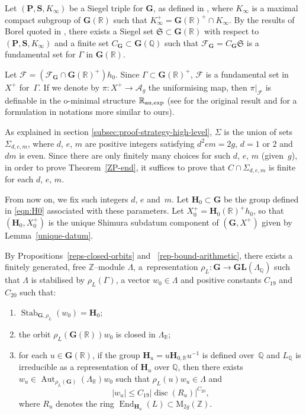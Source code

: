 \documentclass[JEP,XML,SOM,Unicode,NoFloatCountersInSection]{cedram}
\newenvironment{enumeratei}
{\bgroup\def\theenumi{\roman{enumi}}\def\theenumii{\alph{enumii}}\begin{enumerate}}
{\end{enumerate}\egroup}
\newcommand{\bQ}{\mathbb{Q}}
\newcommand{\bR}{\mathbb{R}}
\newcommand{\bZ}{\mathbb{Z}}
\newcommand{\cA}{\mathcal{A}}
\newcommand{\cF}{\mathcal{F}}
\newcommand{\fS}{\mathfrak{S}}
\newcommand{\gG}{\mathbf{G}}
\newcommand{\gGL}{\mathbf{GL}}
\newcommand{\gH}{\mathbf{H}}
\newcommand{\gP}{\mathbf{P}}
\newcommand{\gS}{\mathbf{S}}
\newcommand{\rM}{\mathrm{M}}
\DeclareMathOperator{\Aut}{Aut}
\DeclareMathOperator{\disc}{disc}
\DeclareMathOperator{\End}{End}
\DeclareMathOperator{\Stab}{Stab}
\newcommand{\abs}[1]{\lvert #1 \rvert}
\begin{document}
Let $(\gP, \gS, K_\infty)$ be a Siegel triple for $\gG$, as defined in \cite[\S2B]{Orr18}, where $K_\infty$ is a maximal compact subgroup of $\gG(\bR)$ such that $K^+_\infty=\gG(\bR)^+\cap K_\infty$.
By the results of Borel quoted in \cite[\S2D]{Orr18}, there exists a Siegel set $\fS \subset \gG(\bR)$ with respect to $(\gP, \gS, K_\infty)$ and a finite set $C_\gG\subset\gG(\bQ)$ such that $\cF_{\gG}=C_\gG\fS$ is a fundamental set for $\Gamma$ in $\gG(\bR)$.

Let $\cF = (\cF_\gG \cap \gG(\bR)^+) h_0$. Since $\Gamma \subset \gG(\bR)^+$, $\cF$ is a fundamental set in $X^+$ for~$\Gamma$. If we denote by $\pi:X^+\to\cA_g$ the uniformising map, then $\pi|_{\cF}$ is definable in the o-minimal structure $\bR_{\rm an,exp}$ (see \cite{PS10} for the original result and \cite{kuy:ax-lindemann} for a formulation in notations more similar to ours).

As explained in section \ref{subsec:proof-strategy-high-level}, $\Sigma$ is the union of sets $\Sigma_{d,e,m}$, where $d$, $e$, $m$ are positive integers satisfying $d^2em=2g$, $d=1$ or $2$ and $dm$ is even.
Since there are only finitely many choices for such $d$, $e$, $m$ (given~$g$), in order to prove Theorem~\ref{ZP-end}, it suffices to prove that $C \cap \Sigma_{d,e,m}$ is finite for each $d$, $e$, $m$.

From now on, we fix such integers $d$, $e$ and~$m$. Let $\gH_0 \subset \gG$ be the group defined in \eqref{eqn:H0} associated with these parameters.
Let $X_0^+ = \gH_0(\bR)^+h_0$, so that $(\gH_0, X_0^+)$ is the unique Shimura subdatum component of $(\gG, X^+)$ given by Lemma~\ref{unique-datum}.

By Propositions~\ref{reps-closed-orbits} and~ \ref{rep-bound-arithmetic}, there exists a finitely generated, free $\bZ$--module $\Lambda$, a~re\-pre\-sentation $\rho_L:\gG\to\gGL(\Lambda_\bQ)$ such that $\Lambda$ is stabilised by $\rho_L(\Gamma)$, a vector $w_0\in\Lambda$ and positive constants $C_{19}$ and $C_{20}$ such that:
\begin{enumeratei}
\item $\Stab_{\gG,\rho_L}(w_0) = \gH_0$;

\item the orbit $\rho_L(\gG(\bR))w_0$ is closed in $\Lambda_\bR$;

\item for each $u \in \gG(\bR)$, if the group $\gH_u = u \gH_{0,\bR} u^{-1}$ is defined over~$\bQ$ and $L_\bQ$ is irreducible as a representation of $\gH_u$ over $\bQ$, then there exists $w_u \in \Aut_{\rho_L(\gG)}(\Lambda_\bR) w_0$ such that $\rho_L(u) w_u \in \Lambda$ and
\[
\abs{w_u} \leq C_{19} \abs{\disc(R_u)}^{C_{20}},
\]
where $R_u$ denotes the ring $\End_{\gH_u}(L) \subset \rM_{2g}(\bZ)$.
\end{enumeratei}
\end{document}
